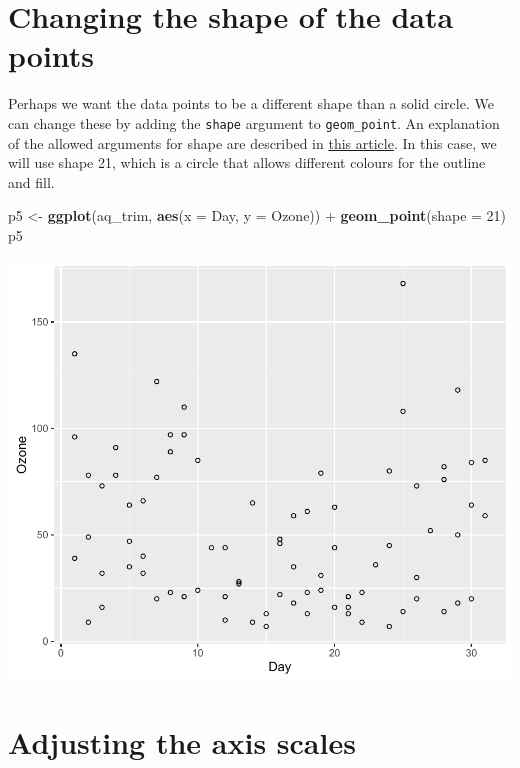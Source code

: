 \documentclass[]{article}
\newenvironment{Shaded}{\begin{snugshade}}{\end{snugshade}}
\newcommand{\KeywordTok}[1]{\textcolor[rgb]{0.13,0.29,0.53}{\textbf{{#1}}}}
\newcommand{\DataTypeTok}[1]{\textcolor[rgb]{0.13,0.29,0.53}{{#1}}}
\newcommand{\DecValTok}[1]{\textcolor[rgb]{0.00,0.00,0.81}{{#1}}}
\newcommand{\StringTok}[1]{\textcolor[rgb]{0.31,0.60,0.02}{{#1}}}
\newcommand{\NormalTok}[1]{{#1}}
\begin{document}
\section{Changing the shape of the data
points}\label{changing-the-shape-of-the-data-points}

Perhaps we want the data points to be a different shape than a solid
circle. We can change these by adding the \texttt{shape} argument to
\texttt{geom\_point}. An explanation of the allowed arguments for shape
are described in
\href{http://sape.inf.usi.ch/quick-reference/ggplot2/shape}{this
article}. In this case, we will use shape 21, which is a circle that
allows different colours for the outline and fill.

\begin{Shaded}
\begin{Highlighting}[]
\NormalTok{p5 <-}\StringTok{ }\KeywordTok{ggplot}\NormalTok{(aq_trim, }\KeywordTok{aes}\NormalTok{(}\DataTypeTok{x =} \NormalTok{Day, }\DataTypeTok{y =} \NormalTok{Ozone)) +}\StringTok{ }\KeywordTok{geom_point}\NormalTok{(}\DataTypeTok{shape =} \DecValTok{21}\NormalTok{)}
\NormalTok{p5}
\end{Highlighting}
\end{Shaded}

\begin{center}\includegraphics{5_Scatter_Plots_pdf/scatter_2-1} \end{center}

\section{Adjusting the axis scales}\label{adjusting-the-axis-scales}
\end{document}
